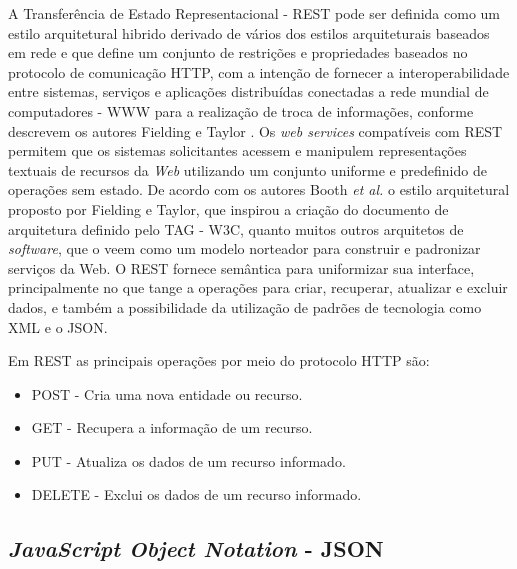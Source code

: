 A Transferência de Estado Representacional - \acrshort{REST} pode ser definida como um estilo arquitetural hibrido derivado de vários dos estilos arquiteturais baseados em rede e que define um conjunto de restrições e propriedades baseados no protocolo de comunicação \acrshort{HTTP}, com a intenção de fornecer a interoperabilidade entre sistemas, serviços e aplicações distribuídas conectadas a rede mundial de computadores - \acrshort{WWW} para a realização de troca de informações, conforme descrevem os autores Fielding e Taylor \cite{fielding2000architectural}. Os \textit{web services} compatíveis com \acrshort{REST} permitem que os sistemas solicitantes acessem e manipulem representações textuais de recursos da \textit{Web} utilizando um conjunto uniforme e predefinido de operações sem estado. De acordo com os autores Booth \textit{et al.} \cite{booth2013web} o estilo arquitetural proposto por Fielding e Taylor, que inspirou a criação do documento de arquitetura definido pelo \acrshort{TAG} - \acrshort{W3C},  quanto muitos outros arquitetos de \textit{software}, que o veem como um modelo norteador para construir e padronizar serviços da Web. O \acrshort{REST} fornece semântica para uniformizar sua interface, principalmente no que tange a  operações para criar, recuperar, atualizar e excluir dados, e  também a possibilidade da utilização de padrões de tecnologia como \acrshort{XML} e o \acrshort{JSON}. 

Em \acrshort{REST} as principais operações por meio do protocolo \acrshort{HTTP} são:

\begin{itemize}

\item POST - Cria uma nova entidade ou recurso. 

\item GET - Recupera a informação de um recurso.

\item PUT - Atualiza os dados de um recurso informado.

\item DELETE - Exclui os dados de um recurso informado.

\end{itemize}


\subsection{\textit{JavaScript Object Notation} - JSON}

